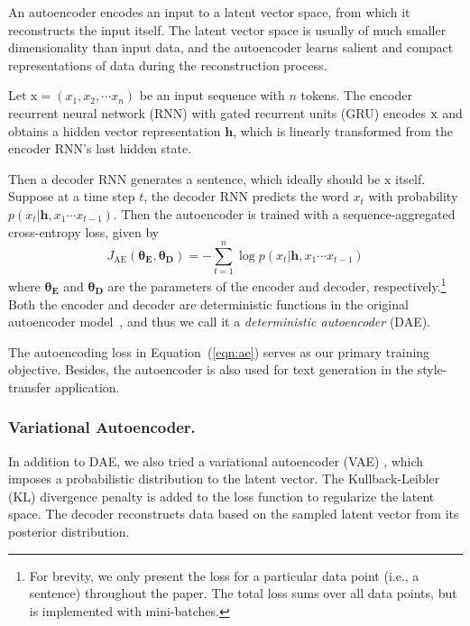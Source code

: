 \documentclass[letterpaper]{article} %
\newcommand{\rmx}{\mathrm x}
\newcommand{\loss}[1]{J_{\text{#1}}}
\newcommand{\nnweight}[1]{\bm{\theta_{\text{#1}}}}
\begin{document}
An autoencoder encodes an input to a latent vector space, from which it reconstructs the input itself.
The latent vector space is usually of much smaller dimensionality than input data, and the autoencoder learns salient and compact representations of data during the reconstruction process.

Let $\rmx=(x_1, x_2, \cdots x_n)$ be an input sequence with $n$ tokens.
The encoder recurrent neural network (RNN) with gated recurrent units (GRU) \cite{cho2014learning} encodes $\rm x$ and obtains a hidden vector representation $\bm h$, which is linearly transformed from the encoder RNN's last hidden state.

Then a decoder RNN generates a sentence, which ideally should be $\rmx$ itself.
Suppose at a time step $t$, the decoder RNN predicts the word $x_t$ with probability $p(x_t|\bm h, x_1\cdots x_{t-1})$. Then the autoencoder is trained with a sequence-aggregated cross-entropy loss, given by
\begin{equation}\label{eqn:ae}
	\loss{AE}(\nnweight{E},\nnweight{D})= -\sum_{t=1}^n \log p(x_t|\bm h, x_1\cdots x_{t-1})
\end{equation}
where $\nnweight{E}$ and $\nnweight{D}$ are the parameters of the encoder and decoder, respectively.\footnote{For brevity, we only present the loss for a particular data point (i.e., a sentence) throughout the paper. The total loss sums over all data points, but is implemented with mini-batches.} Both the encoder and decoder are deterministic functions in the original autoencoder model~\cite{rumelhart1985learning}, and thus we call it a \textit{deterministic autoencoder} (DAE).

The autoencoding loss in Equation~(\ref{eqn:ae}) serves as our primary training objective.
Besides, the autoencoder is also used for text generation in the style-transfer application.


\subsubsection{Variational Autoencoder.}

In addition to DAE, we also tried a variational autoencoder (VAE) \cite{kingma2013auto}, which imposes a probabilistic distribution to the latent vector. The Kullback-Leibler (KL) divergence \cite{kullback1951information} penalty is added to the loss function to regularize the latent space. The decoder reconstructs data based on the sampled latent vector from its posterior distribution.
\end{document}
